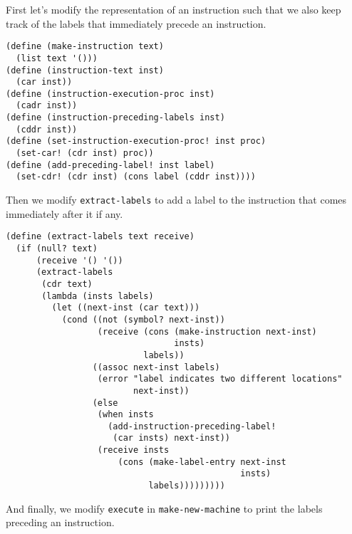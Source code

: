 \documentclass[a4paper,12pt]{article}
\begin{document}
First let's modify the representation of an instruction such that we
also keep track of the labels that immediately precede an instruction.

\begin{lstlisting}
(define (make-instruction text)
  (list text '()))
(define (instruction-text inst)
  (car inst))
(define (instruction-execution-proc inst)
  (cadr inst))
(define (instruction-preceding-labels inst)
  (cddr inst))
(define (set-instruction-execution-proc! inst proc)
  (set-car! (cdr inst) proc))
(define (add-preceding-label! inst label)
  (set-cdr! (cdr inst) (cons label (cddr inst))))
\end{lstlisting}

Then we modify \lstinline!extract-labels! to add a label to the
instruction that comes immediately after it if any.

\begin{lstlisting}
(define (extract-labels text receive)
  (if (null? text)
      (receive '() '())
      (extract-labels
       (cdr text)
       (lambda (insts labels)
         (let ((next-inst (car text)))
           (cond ((not (symbol? next-inst))
                  (receive (cons (make-instruction next-inst)
                                 insts)
                           labels))
                 ((assoc next-inst labels)
                  (error "label indicates two different locations"
                         next-inst))
                 (else
                  (when insts
                    (add-instruction-preceding-label!
                     (car insts) next-inst))
                  (receive insts
                      (cons (make-label-entry next-inst
                                              insts)
                            labels)))))))))
\end{lstlisting}

And finally, we modify \lstinline!execute! in
\lstinline!make-new-machine! to print the labels preceding an
instruction.
\end{document}
